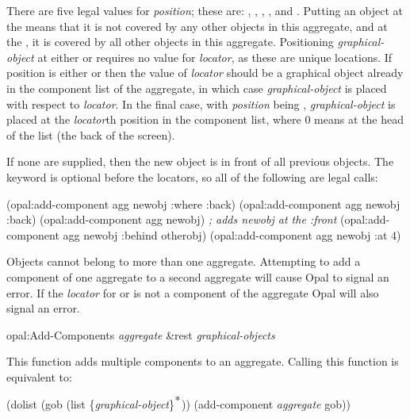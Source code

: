     
There are five legal values for {\it position}; these are: ,
, , , and .  Putting an object
at the  means that it is not covered by any other objects in
this aggregate, and
at the , it is covered by all other objects in this aggregate.
Positioning {\it graphical-object} at either  or 
requires no value
for {\it locator}, as these are unique locations.  If position is either
 or  then the value of {\it locator} should be a
graphical object already in the component list of the aggregate, in which
case {\it graphical-object} is placed with respect to {\it locator}.  In the
final case, with {\it position} being , {\it graphical-object} is placed
at the {\it locator}th position in the component list, where 0 means at
the head of the list (the back of the screen).

If none are supplied, then the new object is
in front of all previous objects.  The  keyword is optional
before the locators, so all of the following are legal calls:
\begin{programexample}
(opal:add-component agg newobj :where :back)
(opal:add-component agg newobj :back)
(opal:add-component agg newobj)       {\it ; adds newobj at the :front}
(opal:add-component agg newobj :behind otherobj)
(opal:add-component agg newobj :at 4)
\end{programexample}

Objects cannot belong to more than one aggregate.  Attempting to add a
component of one aggregate to a second aggregate will cause Opal to signal
an error.  If the {\it locator} for  or  is not a
component of the aggregate Opal will also signal an error.

\vspace{1 line}
\begin{programexample}
opal:Add-Components {\it aggregate} \&rest {\it graphical-objects}\value{function}
\end{programexample}

This function adds multiple components to an aggregate.  Calling
this function is equivalent to:

\begin{programexample}
(dolist (gob (list \{{\it graphical-object}\}$^{\hbox{*}}$))
   (add-component {\it aggregate} gob))
\end{programexample}

